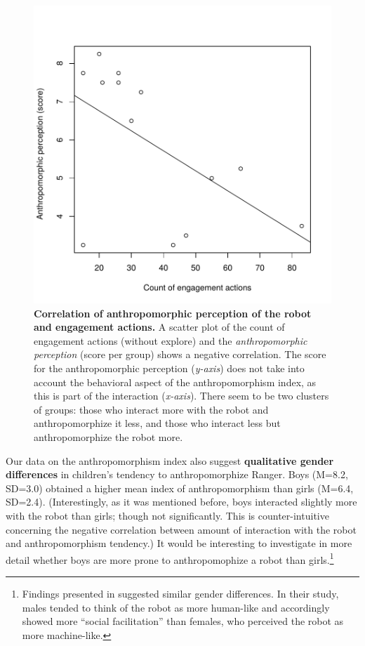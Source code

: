 \documentclass{sig-alternate}
\begin{document}
\begin{figure}[t]
    \centering
    \includegraphics[width=0.8\columnwidth]{domino-correlation.pdf}   

    \caption[Correlation of Anthropomorphic Perception of the Robot and
    Interaction]{\small \textbf{Correlation of anthropomorphic perception of the
    robot and engagement actions.} A scatter plot of the count of engagement
    actions (without explore) and the \textit{anthropomorphic perception} (score per
    group) shows a negative correlation. The score for the anthropomorphic
    perception (\textit{y-axis}) does not take into account the behavioral aspect of
    the anthropomorphism index, as this is part of the interaction
    (\textit{x-axis}).  There seem to be two clusters of groups: those who interact
    more with the robot and anthropomorphize it less, and those who interact less
    but anthropomorphize the robot more.}

    \label{fig:domino-anthropo-interaction}
\end{figure}	

Our data on the anthropomorphism index also suggest \textbf{qualitative gender
differences} in children's tendency to anthropomorphize Ranger. Boys (M=8.2,
SD=3.0) obtained a higher mean index of anthropomorphism than girls (M=6.4,
SD=2.4). (Interestingly, as it was mentioned before, boys interacted slightly
more with the robot than girls; though not significantly. This is
counter-intuitive concerning the negative correlation between amount of
interaction with the robot and anthropomorphism tendency.) It would be
interesting to investigate in more detail whether boys are more prone to
anthropomophize a robot than girls.\footnote{Findings presented in
\cite{schermerhorn_robot_2008} suggested similar gender differences. In their
study, males tended to think of the robot as more human-like and accordingly
showed more ``social facilitation'' than females, who perceived the robot as
more machine-like.} 
\end{document}
